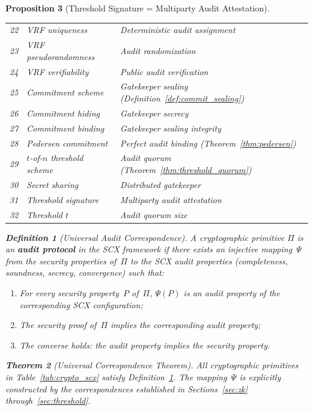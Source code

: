 \documentclass[12pt,a4paper]{article}
\newtheorem{theorem}{Theorem}[section]
\newtheorem{proposition}[theorem]{Proposition}
\newtheorem{definition}[theorem]{Definition}
\theoremstyle{remark}
\newcommand{\SCX}{\textsf{SCX}}
\begin{document}
\begin{proposition}[Threshold Signature = Multiparty Audit Attestation]
\begin{table}[H]
\begin{tabular}{@{}lll@{}}
22 & VRF uniqueness & Deterministic audit assignment \\
23 & VRF pseudorandomness & Audit randomization \\
24 & VRF verifiability & Public audit verification \\
\midrule
25 & Commitment scheme & Gatekeeper sealing (Definition~\ref{def:commit_sealing}) \\
26 & Commitment hiding & Gatekeeper secrecy \\
27 & Commitment binding & Gatekeeper sealing integrity \\
28 & Pedersen commitment & Perfect audit binding (Theorem~\ref{thm:pedersen}) \\
\midrule
29 & $t$-of-$n$ threshold scheme & Audit quorum (Theorem~\ref{thm:threshold_quorum}) \\
30 & Secret sharing & Distributed gatekeeper \\
31 & Threshold signature & Multiparty audit attestation \\
32 & Threshold $t$ & Audit quorum size \\
\bottomrule
\end{tabular}
\end{table}

\begin{definition}[Universal Audit Correspondence]
\label{def:universal_correspondence}
A cryptographic primitive $\Pi$ is an \textbf{audit protocol} in the \SCX{} framework if there exists an injective mapping~$\Psi$ from the security properties of~$\Pi$ to the \SCX{} audit properties (completeness, soundness, secrecy, convergence) such that:
\begin{enumerate}[leftmargin=*, label=(\roman*)]
  \item For every security property~$P$ of~$\Pi$, $\Psi(P)$ is an audit property of the corresponding \SCX{} configuration;
  \item The security proof of~$\Pi$ implies the corresponding audit property;
  \item The converse holds: the audit property implies the security property.
\end{enumerate}
\end{definition}

\begin{theorem}[Universal Correspondence Theorem]
\label{thm:universal_correspondence}
All cryptographic primitives in Table~\ref{tab:crypto_scx} satisfy Definition~\ref{def:universal_correspondence}. The mapping~$\Psi$ is explicitly constructed by the correspondences established in Sections~\ref{sec:zk} through~\ref{sec:threshold}.


\end{theorem}
\end{proposition}
\end{document}

